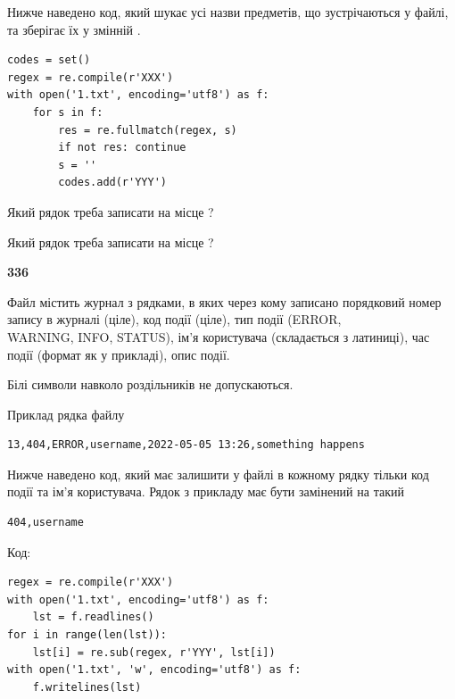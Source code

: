 Нижче наведено код, який шукає усі назви предметів, що зустрічаються у файлі, та зберігає їх у змінній .



\begin{verbatim}
codes = set()
regex = re.compile(r'XXX')
with open('1.txt', encoding='utf8') as f:
    for s in f:
        res = re.fullmatch(regex, s)
        if not res: continue
        s = ''
        codes.add(r'YYY')
\end{verbatim}





Який рядок треба записати на місце  ?\par
\vspace{5mm}


Який рядок треба записати на місце  ?\par


\newpage

{\begin {center}\textbf{ 336}\end {center}}\par
Файл  містить журнал з рядками, в яких через кому записано поряд\-ко\-вий номер запису в журналі (ціле), код події (ціле), тип події (ERROR, \\WARNING, INFO, STATUS), ім'я користувача (складається з латиниці), час події (фор\-мат як у прикладі), опис події.

Білі символи навколо роздільників не допускаються.

Приклад рядка файлу



\begin{verbatim}
13,404,ERROR,username,2022-05-05 13:26,something happens
\end{verbatim}


Нижче наведено код, який має залишити у файлі в кожному рядку тільки код події та ім'я користувача. Рядок з прикладу має бути замінений на такий



\begin{verbatim}
404,username
\end{verbatim}




Код:



\begin{verbatim}
regex = re.compile(r'XXX')
with open('1.txt', encoding='utf8') as f:
    lst = f.readlines()
for i in range(len(lst)):
    lst[i] = re.sub(regex, r'YYY', lst[i])
with open('1.txt', 'w', encoding='utf8') as f:
    f.writelines(lst)
\end{verbatim}







